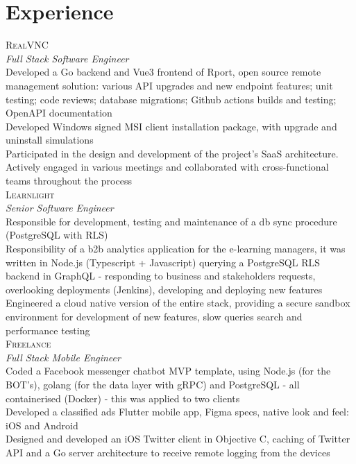 \documentclass[10pt, a4paper]{article}
\newcommand{\note}[1]{\marginnote{\scriptsize #1}}
\begin{document}
\section*{Experience}
\noindent
\note{2022--2023}\textsc{RealVNC}\\
\emph{Full Stack Software Engineer}\\
    Developed a Go backend and Vue3 frontend of Rport, open source
remote management solution: various API upgrades and new endpoint
features; unit testing; code reviews; database migrations; Github
actions builds and testing; OpenAPI documentation\\
    Developed Windows signed MSI client installation package, with
upgrade and uninstall simulations\\
    Participated in the design and development of the project's SaaS
architecture. Actively engaged in various meetings and collaborated with
cross-functional teams throughout the process\\
  [.2cm]
\note{2021--2022}\textsc{Learnlight}\\
\emph{Senior Software Engineer}\\
    Responsible for development, testing and maintenance of a db sync
procedure (PostgreSQL with RLS)\\
    Responsibility of a b2b analytics application for the e-learning
managers, it was written in Node.js (Typescript + Javascript) querying a
PostgreSQL RLS backend in GraphQL - responding to business and
stakeholders requests, overlooking deployments (Jenkins), developing and
deploying new features\\
    Engineered a cloud native version of the entire stack, providing a
secure sandbox environment for development of new features, slow queries
search and performance testing\\
  [.2cm]
\note{2019--2021}\textsc{Freelance}\\
\emph{Full Stack Mobile Engineer}\\
    Coded a Facebook messenger chatbot MVP template, using Node.js (for
the BOT's), golang (for the data layer with gRPC) and PostgreSQL - all
containerised (Docker) - this was applied to two clients\\
    Developed a classified ads Flutter mobile app, Figma specs, native
look and feel: iOS and Android\\
    Designed and developed an iOS Twitter client in Objective C, caching
of Twitter API and a Go server architecture to receive remote logging
from the devices\\
\end{document}
